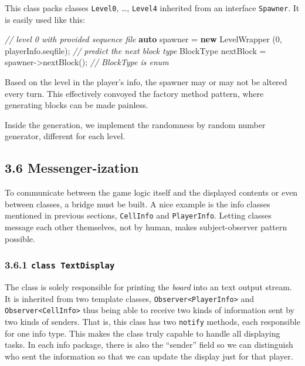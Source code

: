\documentclass[
]{article}
\newenvironment{Shaded}{}{}
\newcommand{\CommentTok}[1]{\textcolor[rgb]{0.38,0.63,0.69}{\textit{#1}}}
\newcommand{\DecValTok}[1]{\textcolor[rgb]{0.25,0.63,0.44}{#1}}
\newcommand{\KeywordTok}[1]{\textcolor[rgb]{0.00,0.44,0.13}{\textbf{#1}}}
\newcommand{\NormalTok}[1]{#1}
\begin{document}
This class packs classes \texttt{Level0}, \ldots, \texttt{Level4}
inherited from an interface \texttt{Spawner}. It is easily used like
this:

\begin{Shaded}
\begin{Highlighting}[]
\CommentTok{// level 0 with provided sequence file}
\KeywordTok{auto}\NormalTok{ spawner = }\KeywordTok{new}\NormalTok{ LevelWrapper (}\DecValTok{0}\NormalTok{, playerInfo.seqfile);}
\CommentTok{// predict the next block type}
\NormalTok{BlockType nextBlock = spawner->nextBlock(); }\CommentTok{// BlockType is enum}
\end{Highlighting}
\end{Shaded}

Based on the level in the player's info, the spawner may or may not be
altered every turn. This effectively convoyed the factory method
pattern, where generating blocks can be made painless.

Inside the generation, we implement the randomness by random number
generator, different for each level.

\hypertarget{messenger-ization}{%
\subsection{3.6 Messenger-ization}\label{messenger-ization}}

To communicate between the game logic itself and the displayed contents
or even between classes, a bridge must be built. A nice example is the
info classes mentioned in previous sections, \texttt{CellInfo} and
\texttt{PlayerInfo}. Letting classes message each other themselves, not
by human, makes subject-observer pattern possible.

\hypertarget{class-textdisplay}{%
\subsubsection{\texorpdfstring{3.6.1
\texttt{class\ TextDisplay}}{3.6.1 class TextDisplay}}\label{class-textdisplay}}

The class is solely responsible for printing the \emph{board} into an
text output stream. It is inherited from two template classes,
\texttt{Observer\textless{}PlayerInfo\textgreater{}} and
\texttt{Observer\textless{}CellInfo\textgreater{}} thus being able to
receive two kinds of information sent by two kinds of senders. That is,
this class has two \texttt{notify} methods, each responsible for one
info type. This makes the class truly capable to handle all displaying
tasks. In each info package, there is also the ``sender'' field so we
can distinguish who sent the information so that we can update the
display just for that player.
\end{document}
